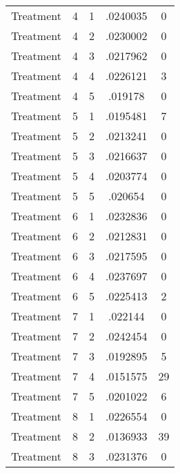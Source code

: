 \begin{tabular}{l*{4}{c}}
Treatment           &           4&           1&    .0240035&           0\\
Treatment           &           4&           2&    .0230002&           0\\
Treatment           &           4&           3&    .0217962&           0\\
Treatment           &           4&           4&    .0226121&           3\\
Treatment           &           4&           5&     .019178&           0\\
Treatment           &           5&           1&    .0195481&           7\\
Treatment           &           5&           2&    .0213241&           0\\
Treatment           &           5&           3&    .0216637&           0\\
Treatment           &           5&           4&    .0203774&           0\\
Treatment           &           5&           5&     .020654&           0\\
Treatment           &           6&           1&    .0232836&           0\\
Treatment           &           6&           2&    .0212831&           0\\
Treatment           &           6&           3&    .0217595&           0\\
Treatment           &           6&           4&    .0237697&           0\\
Treatment           &           6&           5&    .0225413&           2\\
Treatment           &           7&           1&     .022144&           0\\
Treatment           &           7&           2&    .0242454&           0\\
Treatment           &           7&           3&    .0192895&           5\\
Treatment           &           7&           4&    .0151575&          29\\
Treatment           &           7&           5&    .0201022&           6\\
Treatment           &           8&           1&    .0226554&           0\\
Treatment           &           8&           2&    .0136933&          39\\
Treatment           &           8&           3&    .0231376&           0\\

\end{tabular}
